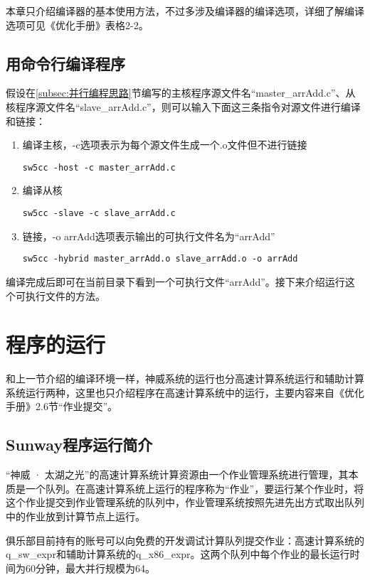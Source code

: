 本章只介绍编译器的基本使用方法，不过多涉及编译器的编译选项，详细了解编译选项可见《优化手册》表格2-2。

\subsection{用命令行编译程序}\label{subsec:用命令行编译程序}
假设在\ref{subsec:并行编程思路}节编写的主核程序源文件名“master\_arrAdd.c”、从核程序源文件名“slave\_arrAdd.c”，则可以输入下面这三条指令对源文件进行编译和链接：
\begin{enumerate}
  \item 编译主核，-c选项表示为每个源文件生成一个.o文件但不进行链接
\begin{lstlisting}
sw5cc -host -c master_arrAdd.c
\end{lstlisting}
  \item 编译从核
\begin{lstlisting}
sw5cc -slave -c slave_arrAdd.c
\end{lstlisting}
  \item 链接，-o arrAdd选项表示输出的可执行文件名为“arrAdd”
\begin{lstlisting}
sw5cc -hybrid master_arrAdd.o slave_arrAdd.o -o arrAdd
\end{lstlisting}
\end{enumerate}

编译完成后即可在当前目录下看到一个可执行文件“arrAdd”。接下来介绍运行这个可执行文件的方法。

\section{程序的运行}
和上一节介绍的编译环境一样，神威系统的运行也分高速计算系统运行和辅助计算系统运行两种，这里也只介绍程序在高速计算系统中的运行，主要内容来自《优化手册》2.6节“作业提交”。

\subsection{Sunway程序运行简介}
“神威 · 太湖之光”的高速计算系统计算资源由一个作业管理系统进行管理，其本质是一个队列。在高速计算系统上运行的程序称为“作业”，要运行某个作业时，将这个作业提交到作业管理系统的队列中，作业管理系统按照先进先出方式取出队列中的作业放到计算节点上运行。

俱乐部目前持有的账号可以向免费的开发调试计算队列提交作业：高速计算系统的q\_sw\_expr和辅助计算系统的q\_x86\_expr。这两个队列中每个作业的最长运行时间为60分钟，最大并行规模为64。

